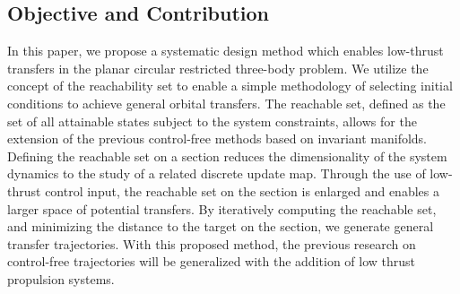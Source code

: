 \documentclass[smallcondensed]{svjour3}
\begin{document}





\subsection{Objective and Contribution}
In this paper, we propose a systematic design method which enables low-thrust transfers in the planar circular restricted three-body problem.
We utilize the concept of the reachability set to enable a simple methodology of selecting initial conditions to achieve general orbital transfers. 
The reachable set, defined as the set of all attainable states subject to the system constraints, allows for the extension of the previous control-free methods based on invariant manifolds.
Defining the reachable set on a \Poincare section reduces the dimensionality of the system dynamics to the study of a related discrete update map.
Through the use of low-thrust control input, the reachable set on the \Poincare section is enlarged and enables a larger space of potential transfers.
By iteratively computing the reachable set, and minimizing the distance to the target on the \Poincare section, we generate general transfer trajectories.
With this proposed method, the previous research on control-free trajectories will be generalized with the addition of low thrust propulsion systems.
\end{document}
